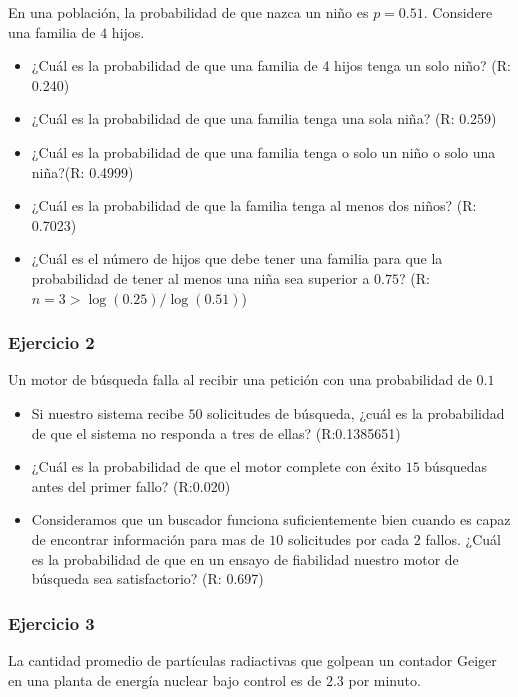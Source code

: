 \documentclass[
]{book}
\providecommand{\tightlist}{%
  \setlength{\itemsep}{0pt}\setlength{\parskip}{0pt}}
\begin{document}
En una población, la probabilidad de que nazca un niño es \(p=0.51\). Considere una familia de \(4\) hijos.

\begin{itemize}
\tightlist
\item
  ¿Cuál es la probabilidad de que una familia de 4 hijos tenga un solo niño? (R: 0.240)
\item
  ¿Cuál es la probabilidad de que una familia tenga una sola niña? (R: 0.259)
\item
  ¿Cuál es la probabilidad de que una familia tenga o solo un niño o solo una niña?(R: 0.4999)
\item
  ¿Cuál es la probabilidad de que la familia tenga al menos dos niños? (R: 0.7023)
\item
  ¿Cuál es el número de hijos que debe tener una familia para que la probabilidad de tener al menos una niña sea superior a \(0.75\)? (R:\(n=3>\log(0.25)/\log(0.51)\))
\end{itemize}

\hypertarget{ejercicio-2-4}{%
\subsubsection{Ejercicio 2}\label{ejercicio-2-4}}

Un motor de búsqueda falla al recibir una petición con una probabilidad de \(0.1\)

\begin{itemize}
\item
  Si nuestro sistema recibe \(50\) solicitudes de búsqueda, ¿cuál es la probabilidad de que el sistema no responda a tres de ellas? (R:0.1385651)
\item
  ¿Cuál es la probabilidad de que el motor complete con éxito \(15\) búsquedas antes del primer fallo? (R:0.020)
\item
  Consideramos que un buscador funciona suficientemente bien cuando es capaz de encontrar información para mas de \(10\) solicitudes por cada \(2\) fallos. ¿Cuál es la probabilidad de que en un ensayo de fiabilidad nuestro motor de búsqueda sea satisfactorio?
  (R: 0.697)
\end{itemize}

\hypertarget{ejercicio-3-2}{%
\subsubsection{Ejercicio 3}\label{ejercicio-3-2}}

La cantidad promedio de partículas radiactivas que golpean un contador Geiger en una planta de energía nuclear bajo control es de \(2.3\) por minuto.
\end{document}
